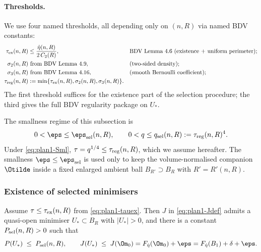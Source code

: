 \paragraph{Thresholds.}
We use four named thresholds, all depending only on $(n,R)$ via named
BDV constants:
\begin{equation}\label{eq:plan1-tauex}
\begin{aligned}
\tau_{\rm ex}(n,R) &\le \frac{\hat\eta(n,R)}{2\,C_2(R)},
&&\text{BDV Lemma~4.6 (existence + uniform perimeter)};\\
\sigma_2(n,R)
&\text{ from BDV Lemma~4.9}, &&\text{(two-sided density)};\\
\sigma_3(n,R)
&\text{ from BDV Lemma~4.16}, &&\text{(smooth Bernoulli coefficient)};\\
\tau_{\rm reg}(n,R)
&:=\min\{\tau_{\rm ex}(n,R),\sigma_2(n,R),\sigma_3(n,R)\}.
\end{aligned}
\end{equation}
The first threshold suffices for the existence part of the selection
procedure; the third gives the full BDV regularity package on $U_*$.

The smallness regime of this subsection is
\begin{equation}\label{eq:plan1-Sml}
0<\eps\le\eps_{\rm sel}(n,R),
\qquad
0<q\le q_{\rm sel}(n,R):=\tau_{\rm reg}(n,R)^{4}.
\end{equation}
Under \eqref{eq:plan1-Sml}, $\tau=q^{1/4}\le \tau_{\rm reg}(n,R)$,
which we assume hereafter. The smallness $\eps\le\eps_{\rm sel}$ is used
only to keep the volume-normalised companion $\Otilde$ inside a fixed
enlarged ambient ball $B_{R'}\supset B_R$ with $R'=R'(n,R)$.

\medskip

\subsubsection{Existence of selected minimisers}
\label{subsubsec:plan1-sel-existence}

\begin{lemma}
\label{lem:plan1-sel-existence}
Assume $\tau\le\tau_{\rm ex}(n,R)$ from \eqref{eq:plan1-tauex}. Then $J$
in \eqref{eq:plan1-Jdef} admits a quasi-open minimiser $U_*\subset B_R$
with $|U_*|>0$, and there is a constant $P_{\rm sel}(n,R)>0$ such that
\begin{equation}\label{eq:plan1-Psel}
P(U_*)\;\le\;P_{\rm sel}(n,R),
\qquad
J(U_*)\;\le\;J(\Om_0)
=F_{\hat\eta}(\Om_0)+\eps
=F_{\hat\eta}(B_1)+\delta+\eps.
\end{equation}
\end{lemma}


